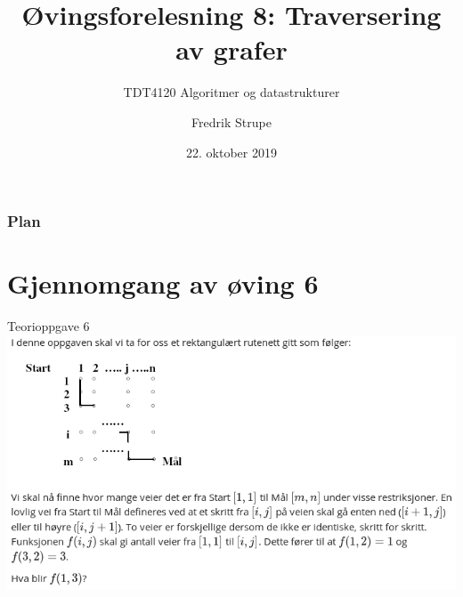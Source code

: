 \documentclass[14pt]{beamer}
\title{Øvingsforelesning 8: Traversering av grafer}
\subtitle{TDT4120 Algoritmer og datastrukturer}
\date{22. oktober 2019}
\author{Fredrik Strupe}
\institute{NTNU}
\begin{document}
\maketitle
\begin{frame}
    \frametitle{Plan}
    \tableofcontents
\end{frame}

\section{Gjennomgang av øving 6}
\begin{frame}{Teorioppgave 6}
    \includegraphics[width=\textwidth]{images/06t_q6.png}
\end{frame}
\end{document}
